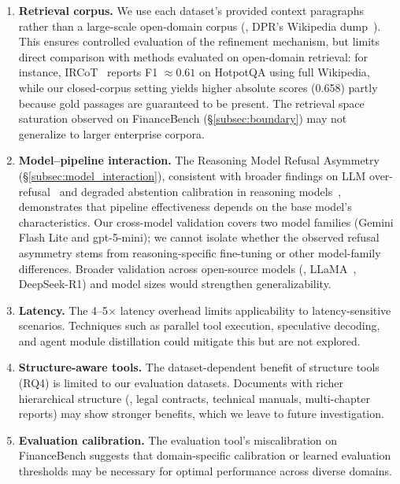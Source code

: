 \begin{enumerate}
    \item \textbf{Retrieval corpus.} We use each dataset's provided context paragraphs rather than a large-scale open-domain corpus (\eg, DPR's Wikipedia dump~\cite{karpukhin2020dense}).
    This ensures controlled evaluation of the refinement mechanism, but limits direct comparison with methods evaluated on open-domain retrieval: for instance, IRCoT~\cite{trivedi2023ircot} reports F1 $\approx 0.61$ on HotpotQA using full Wikipedia, while our closed-corpus setting yields higher absolute scores (0.658) partly because gold passages are guaranteed to be present.
    The retrieval space saturation observed on FinanceBench (\S\ref{subsec:boundary}) may not generalize to larger enterprise corpora.

    \item \textbf{Model--pipeline interaction.} The Reasoning Model Refusal Asymmetry (\S\ref{subsec:model_interaction}), consistent with broader findings on LLM over-refusal~\cite{cui2025orbench} and degraded abstention calibration in reasoning models~\cite{kirichenko2025abstentionbench}, demonstrates that pipeline effectiveness depends on the base model's characteristics.
    Our cross-model validation covers two model families (Gemini Flash Lite and gpt-5-mini); we cannot isolate whether the observed refusal asymmetry stems from reasoning-specific fine-tuning or other model-family differences.
    Broader validation across open-source models (\eg, LLaMA~\cite{touvron2023llama}, DeepSeek-R1) and model sizes would strengthen generalizability.

    \item \textbf{Latency.} The 4--5$\times$ latency overhead limits applicability to latency-sensitive scenarios.
    Techniques such as parallel tool execution, speculative decoding, and agent module distillation could mitigate this but are not explored.

    \item \textbf{Structure-aware tools.} The dataset-dependent benefit of structure tools (RQ4) is limited to our evaluation datasets.
    Documents with richer hierarchical structure (\eg, legal contracts, technical manuals, multi-chapter reports) may show stronger benefits, which we leave to future investigation.

    \item \textbf{Evaluation calibration.} The evaluation tool's miscalibration on FinanceBench suggests that domain-specific calibration or learned evaluation thresholds may be necessary for optimal performance across diverse domains.


\end{enumerate}
